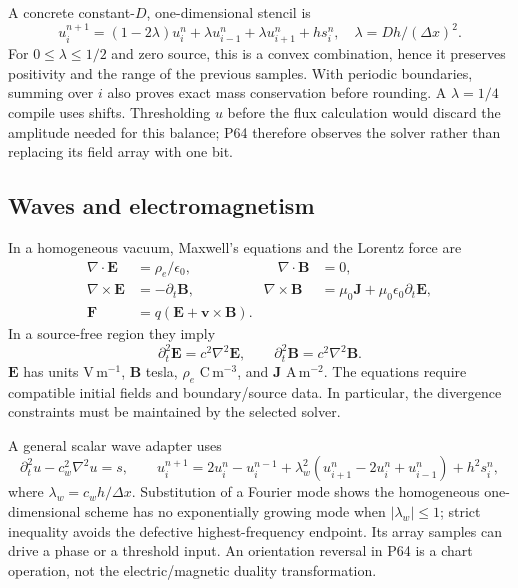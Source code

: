 \documentclass[11pt,a4paper]{article}
\numberwithin{equation}{section}
\begin{document}
A concrete constant-$D$, one-dimensional stencil is
\begin{equation}
u_i^{n+1}=(1-2\lambda)u_i^n+\lambda u_{i-1}^n+\lambda u_{i+1}^n+h s_i^n,
\quad\lambda=Dh/(\Delta x)^2.
\end{equation}
For $0\le\lambda\le1/2$ and zero source, this is a convex combination, hence it preserves positivity and the range of the previous samples. With periodic boundaries, summing over $i$ also proves exact mass conservation before rounding. A $\lambda=1/4$ compile uses shifts. Thresholding $u$ before the flux calculation would discard the amplitude needed for this balance; P64 therefore observes the solver rather than replacing its field array with one bit.

\subsection{Waves and electromagnetism}
In a homogeneous vacuum, Maxwell's equations and the Lorentz force are \cite[Ch.~18]{maxwell}
\begin{align}
\nabla\cdot\bm E&=\rho_e/\epsilon_0,&\quad\nabla\cdot\bm B&=0,\\
\nabla\times\bm E&=-\partial_t\bm B,&
\nabla\times\bm B&=\mu_0\bm J+\mu_0\epsilon_0\partial_t\bm E,\\
\bm F&=q(\bm E+\bm v\times\bm B).&&
\end{align}
In a source-free region they imply
\begin{equation}
\partial_t^2\bm E=c^2\nabla^2\bm E,\qquad
\partial_t^2\bm B=c^2\nabla^2\bm B.
\end{equation}
$\bm E$ has units $\mathrm{V\,m^{-1}}$, $\bm B$ tesla, $\rho_e$ $\mathrm{C\,m^{-3}}$, and $\bm J$ $\mathrm{A\,m^{-2}}$. The equations require compatible initial fields and boundary/source data. In particular, the divergence constraints must be maintained by the selected solver.

A general scalar wave adapter uses
\begin{equation}
\partial_t^2u-c_w^2\nabla^2u=s,
\qquad
u_i^{n+1}=2u_i^n-u_i^{n-1}+\lambda_w^2(u_{i+1}^n-2u_i^n+u_{i-1}^n)+h^2s_i^n,
\end{equation}
where $\lambda_w=c_wh/\Delta x$. Substitution of a Fourier mode shows the homogeneous one-dimensional scheme has no exponentially growing mode when $|\lambda_w|\le1$; strict inequality avoids the defective highest-frequency endpoint. Its array samples can drive a phase or a threshold input. An orientation reversal in P64 is a chart operation, not the electric/magnetic duality transformation.
\end{document}
